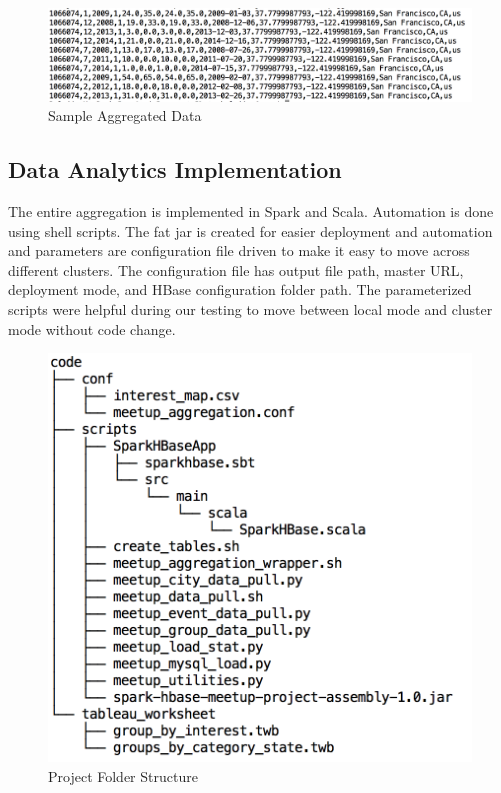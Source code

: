 \documentclass{acm_proc_article-sp}
\begin{document}
\begin{figure}[!ht]
  \centering
      \includegraphics[width=1.0\columnwidth]{images/sample_aggregated_data.png}
  \caption{Sample Aggregated Data}\label{F:sampledata}
\end{figure}

\subsection{Data Analytics Implementation}
The entire aggregation is implemented in Spark and Scala.  Automation is done using shell scripts.  The fat jar is created for easier deployment and automation and parameters are configuration file driven to make it easy to move across different clusters.  The configuration file has output file path, master URL, deployment mode, and HBase configuration folder path.  The parameterized scripts were helpful during our testing to move between local mode and cluster mode without code change.

\begin{figure}[!ht]
  \centering
      \includegraphics[width=1.0\columnwidth]{images/code_directory_tree.png}
  \caption{Project Folder Structure}\label{F:codetree}
\end{figure}
\end{document}
